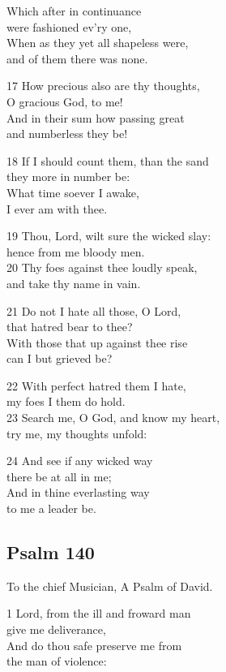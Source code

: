 Which after in continuance\\
were fashioned ev’ry one,\\
When as they yet all shapeless were,\\
and of them there was none.

17 How precious also are thy thoughts,\\
O gracious God, to me!\\
And in their sum how passing great\\
and numberless they be!

18 If I should count them, than the sand\\
they more in number be:\\
What time soever I awake,\\
I ever am with thee.

19 Thou, Lord, wilt sure the wicked slay:\\
hence from me bloody men.\\
20 Thy foes against thee loudly speak,\\
and take thy name in vain.

21 Do not I hate all those, O Lord,\\
that hatred bear to thee?\\
With those that up against thee rise\\
can I but grieved be?

22 With perfect hatred them I hate,\\
my foes I them do hold.\\
23 Search me, O God, and know my heart,\\
try me, my thoughts unfold:

24 And see if any wicked way\\
there be at all in me;\\
And in thine everlasting way\\
to me a leader be.

\begin{center}
\quad{}\quad{}
\end{center}

\subsection*{Psalm 140}

To the chief Musician,
A Psalm of David.

1 Lord, from the ill and froward man\\
give me deliverance,\\
And do thou safe preserve me from\\
the man of violence:

